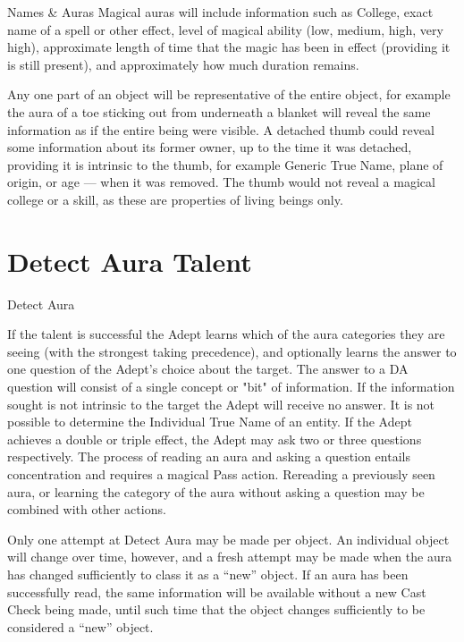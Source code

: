 \begin{Chapter}{Names \& Auras}
Magical auras will include information such as College, exact name of
a spell or other effect, level of magical ability (low, medium, high,
very high), approximate length of time that the magic has been in
effect (providing it is still present), and approximately how much
duration remains.

Any one part of an object will be representative of the entire object,
for example the aura of a toe sticking out from underneath a blanket
will reveal the same information as if the entire being were visible.
A detached thumb could reveal some information about its former
owner, up to the time it was detached, providing it is intrinsic to
the thumb, for example Generic True Name, plane of origin, or age —
when it was removed. The thumb would not reveal a magical college or a
skill, as these are properties of living beings only.

\section{Detect Aura Talent}

\begin{talent}{Detect Aura}
\begin{effects}
If the talent is successful the Adept learns which of the aura
categories they are seeing (with the strongest taking precedence), and
optionally learns the answer to one question of the Adept’s choice
about the target. The answer to a DA question will consist of a single
concept or "bit" of information. If the information sought is not
intrinsic to the target the Adept will receive no answer.  It is not
possible to determine the Individual True Name of an entity.  If the
Adept achieves a double or triple effect, the Adept may ask two or
three questions respectively.  The process of reading an aura and
asking a question entails concentration and requires a magical Pass
action.  Rereading a previously seen aura, or learning the category of
the aura without asking a question may be combined with other actions.

Only one attempt at Detect Aura may be made per object. An individual
object will change over time, however, and a fresh attempt may be made
when the aura has changed sufficiently to class it as a “new”
object. If an aura has been successfully read, the same information
will be available without a new Cast Check being made, until such time
that the object changes sufficiently to be considered a “new” object.


\end{effects}
\end{talent}
\end{Chapter}
